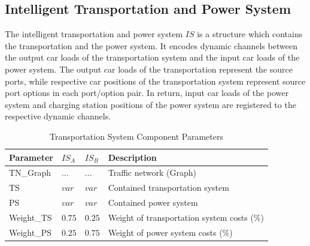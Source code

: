 \subsection{Intelligent Transportation and Power System}

The intelligent transportation and power system $IS$ is a structure which contains the transportation and the power system.
It encodes dynamic channels between the output car loads of the transportation system and the input car loads of the power system. The output car loads of the transportation represent the source ports, while respective car positions of the transportation system represent source port options in each port/option pair. In return, input car loads of the power system and charging station positions of the power system are registered to the respective dynamic channels. 

\begin{table}[h]
	\renewcommand{\arraystretch}{1.3}
	\caption{Transportation System Component Parameters}
	\centering
	\begin{tabular}{llll}
		\hline
		\textbf{Parameter}     & \textbf{$IS_{A}$} & \textbf{$IS_{B}$}       & \textbf{Description} \\ \hline
		TN\_Graph               & $...$ & $...$  	  & Traffic network (Graph)     \\
		TS     & $var$   & $var$ 	  & Contained transportation system     \\
		PS               & $var$ 	 & $var$ & Contained power system    \\
		Weight\_TS               & $0.75$  & $0.25$ & Weight of transportation system costs (\%)       \\ 
		Weight\_PS               & $0.25$  & $0.75$  		  & Weight of power system costs (\%)   \\ \hline
	\end{tabular}
\end{table}




